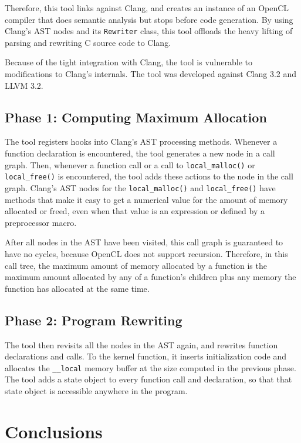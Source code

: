 \documentclass{article}
\begin{document}
Therefore, this tool links against Clang, and creates an instance of an OpenCL compiler that does semantic analysis but stops before code generation. By using Clang's AST nodes and its \texttt{Rewriter} class, this tool offloads the heavy lifting of parsing and rewriting C source code to Clang.

Because of the tight integration with Clang, the tool is vulnerable to modifications to Clang's internals. The tool was developed against Clang 3.2 and LLVM 3.2.

\subsection{Phase 1: Computing Maximum Allocation}
The tool registers hooks into Clang's AST processing methods. Whenever a function declaration is encountered, the tool generates a new node in a call graph. Then, whenever a function call or a call to \texttt{local\_malloc()} or \texttt{local\_free()} is encountered, the tool adds these actions to the node in the call graph. Clang's AST nodes for the \texttt{local\_malloc()} and \texttt{local\_free()} have methods that make it easy to get a numerical value for the amount of memory allocated or freed, even when that value is an expression or defined by a preprocessor macro.

After all nodes in the AST have been visited, this call graph is guaranteed to have no cycles, because OpenCL does not support recursion. Therefore, in this call tree, the maximum amount of memory allocated by a function is the maximum amount allocated by any of a function's children plus any memory the function has allocated at the same time.

\subsection{Phase 2: Program Rewriting}
The tool then revisits all the nodes in the AST again, and rewrites function declarations and calls. To the kernel function, it inserts initialization code and allocates the \texttt{\_\_local} memory buffer at the size computed in the previous phase. The tool adds a state object to every function call and declaration, so that that state object is accessible anywhere in the program.

\section{Conclusions}




\end{document}
